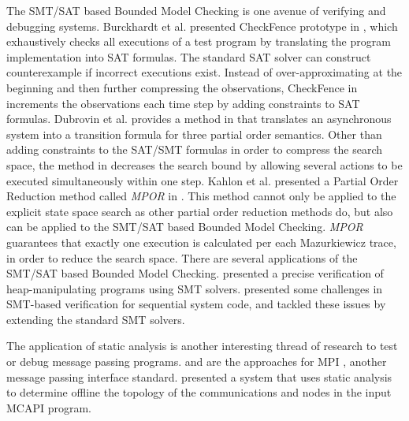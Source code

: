 The SMT/SAT based Bounded Model Checking is one avenue of verifying and debugging systems. Burckhardt et al. presented CheckFence prototype in \cite{burckhardt:pldi07}, which exhaustively checks all executions of a test program by translating the program implementation into SAT formulas. The standard SAT solver can construct counterexample if incorrect executions exist. Instead of over-approximating at the beginning and then further compressing the observations, CheckFence in \cite{burckhardt:pldi07} increments the observations each time step by adding constraints to SAT formulas. Dubrovin et al. provides a method in \cite{heljanko:scp} that translates an asynchronous system into a transition formula for three partial order semantics. Other than adding constraints to the SAT/SMT formulas in order to compress the search space, the method in \cite{heljanko:scp} decreases the search bound by allowing several actions to be executed simultaneously within one step. Kahlon et al. presented a Partial Order Reduction method called \textit{MPOR} in \cite{kahlon:cav09}. This method cannot only be applied to the explicit state space search as other partial order reduction methods do, but also can be applied to the SMT/SAT based Bounded Model Checking. \textit{MPOR} guarantees that exactly one execution is calculated per each Mazurkiewicz trace, in order to reduce the search space. There are several applications of the SMT/SAT based Bounded Model Checking. \cite{lahiri:popl08} presented a precise verification of heap-manipulating programs using SMT solvers. \cite{lahiri:cav11} presented some challenges in SMT-based verification for sequential system code, and tackled these issues by extending the standard SMT solvers.

The application of static analysis is another interesting thread of research to test or debug message passing programs. \cite{zhang:ppopp07} and \cite{greg:cgo09} are the approaches for MPI \cite{mpi}, another message passing interface standard. \cite{gray:lctes11} presented a system that uses static analysis to determine offline the topology of the communications and nodes in the input MCAPI program.
